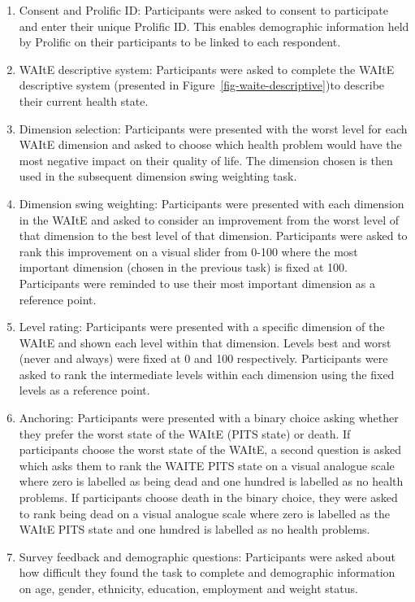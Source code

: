 \documentclass[
  letterpaper,
  DIV=11,
  numbers=noendperiod]{scrartcl}
\providecommand{\tightlist}{%
  \setlength{\itemsep}{0pt}\setlength{\parskip}{0pt}}\usepackage{longtable,booktabs,array}
\begin{document}
\begin{enumerate}
\def\labelenumi{\arabic{enumi}.}
\tightlist
\item
  Consent and Prolific ID: Participants were asked to consent to
  participate and enter their unique Prolific ID. This enables
  demographic information held by Prolific on their participants to be
  linked to each respondent.
\item
  WAItE descriptive system: Participants were asked to complete the
  WAItE descriptive system (presented in
  Figure~\ref{fig-waite-descriptive})to describe their current health
  state.
\item
  Dimension selection: Participants were presented with the worst level
  for each WAItE dimension and asked to choose which health problem
  would have the most negative impact on their quality of life. The
  dimension chosen is then used in the subsequent dimension swing
  weighting task.\\
\item
  Dimension swing weighting: Participants were presented with each
  dimension in the WAItE and asked to consider an improvement from the
  worst level of that dimension to the best level of that dimension.
  Participants were asked to rank this improvement on a visual slider
  from 0-100 where the most important dimension (chosen in the previous
  task) is fixed at 100. Participants were reminded to use their most
  important dimension as a reference point.\\
\item
  Level rating: Participants were presented with a specific dimension of
  the WAItE and shown each level within that dimension. Levels best and
  worst (never and always) were fixed at 0 and 100 respectively.
  Participants were asked to rank the intermediate levels within each
  dimension using the fixed levels as a reference point.
\item
  Anchoring: Participants were presented with a binary choice asking
  whether they prefer the worst state of the WAItE (PITS state) or
  death. If participants choose the worst state of the WAItE, a second
  question is asked which asks them to rank the WAITE PITS state on a
  visual analogue scale where zero is labelled as being dead and one
  hundred is labelled as no health problems. If participants choose
  death in the binary choice, they were asked to rank being dead on a
  visual analogue scale where zero is labelled as the WAItE PITS state
  and one hundred is labelled as no health problems.
\item
  Survey feedback and demographic questions: Participants were asked
  about how difficult they found the task to complete and demographic
  information on age, gender, ethnicity, education, employment and
  weight status.
\end{enumerate}
\end{document}
